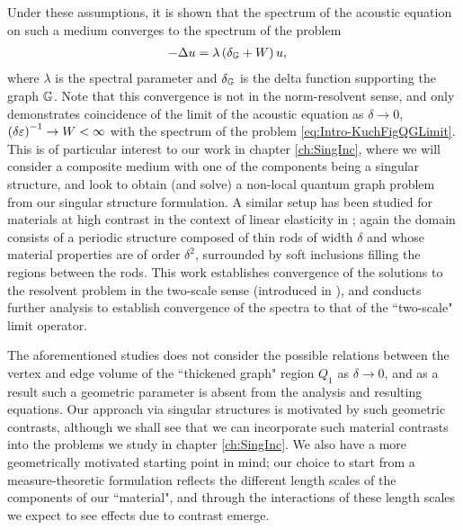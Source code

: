 Under these assumptions, it is shown that the spectrum of the acoustic equation on such a medium converges to the spectrum of the problem
\begin{align} \label{eq:Intro-KuchFigQGLimit}
	-\Delta u &= \lambda\left( \delta_{\mathbb{G}} + W \right)u,
\end{align}
where $\lambda$ is the spectral parameter and $\delta_{\mathbb{G}}$ is the delta function supporting the graph $\mathbb{G}$.
Note that this convergence is not in the norm-resolvent sense, and only demonstrates coincidence of the limit of the acoustic equation as $\delta\rightarrow0$, $\left( \delta\varepsilon \right)^{-1}\rightarrow W<\infty$ with the spectrum of the problem \eqref{eq:Intro-KuchFigQGLimit}.
This is of particular interest to our work in chapter \ref{ch:SingInc}, where we will consider a composite medium with one of the components being a singular structure, and look to obtain (and solve) a non-local quantum graph problem from our singular structure formulation.
A similar setup has been studied for materials at high contrast in the context of linear elasticity in \cite{cherednichenko2019homogenisation}; again the domain consists of a periodic structure composed of thin rods of width $\delta$ and whose material properties are of order $\delta^2$, surrounded by soft inclusions filling the regions between the rods.
This work establishes convergence of the solutions to the resolvent problem in the two-scale sense (introduced in \cite{zhikov2000extension}), and conducts further analysis to establish convergence of the spectra to that of the ``two-scale" limit operator.

The aforementioned studies does not consider the possible relations between the vertex and edge volume of the ``thickened graph" region $Q_1$ as $\delta\rightarrow0$, and as a result such a geometric parameter is absent from the analysis and resulting equations.
Our approach via singular structures is motivated by such geometric contrasts, although we shall see that we can incorporate such material contrasts into the problems we study in chapter \ref{ch:SingInc}.
We also have a more geometrically motivated starting point in mind; our choice to start from a measure-theoretic formulation reflects the different length scales of the components of our ``material", and through the interactions of these length scales we expect to see effects due to contrast emerge.